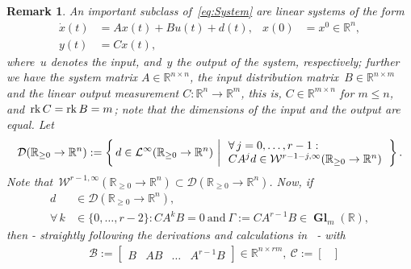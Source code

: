 \documentclass[ envcountsect, envcountsame]{svjour3}
\newtheorem{Remark}[Theorem]{Remark}
\newcommand{\setdef}[2]{\left\{\, #1\, \left|\, \vphantom{#1} #2 \right.\right\}}
\newcommand{\R}{\mathbb{R}}
\newcommand{\cB}{\mathcal{B}}
\newcommand{\cC}{\mathcal{C}}
\newcommand{\cD}{\mathcal{D}}
\newcommand{\cL}{\mathcal{L}}
\newcommand{\cW}{\mathcal{W}}
\newcommand{\rp}{\mathbb{R}_{\geq 0}}
\DeclareMathOperator{\Gl}{\mathbf{Gl}}
\DeclareMathOperator{\rk}{\rm rk}
\begin{document}
%
\begin{Remark} \label{Rem:linear-systems}
An important subclass of~\eqref{eq:System} are linear systems of the form 
\begin{equation} \label{eq:linear-system}
\begin{aligned}
\dot x(t) &=  Ax(t) +   B u(t) + d(t) , & x(0) &= x^0 \in \R^n,\\
y(t) &=  Cx(t),
\end{aligned}
\end{equation}
where~$u$ denotes the input, and~$y$ the output of the system, respectively; further we have the system matrix $ A \in \R^{n \times n}$, 
the input distribution matrix~$ B \in \R^{n \times m}$ and the linear output measurement $ C : \R^{n} \to \R^m$, this is, $ C \in \R^{m \times n}$ for $m \le n$, and~$\rk C = \rk B = m$; note that the dimensions of the input and the output are equal.
%
Let
\begin{equation*}
\begin{aligned}
\cD(\rp \to \R^n) := \setdef{ d \in \cL^\infty(\rp \to \R^n)}{ \begin{array}{l}
\forall \, j=0,\ldots,r-1: \\
CA^{j} d \in \cW^{r-1-j,\infty}(\rp \to \R^n) 
\end{array}  } .
\end{aligned}
\end{equation*}
Note that~$\cW^{r-1,\infty}(\rp \to \R^n) \subset \cD(\rp \to \R^n)$.
%
Now, if
\begin{equation} \label{def:rel-dg-linear-system}
\begin{aligned}
d & \in \cD(\rp \to \R^n), \\
 \forall\, k  &\in \{0,\ldots,r-2\} :  C  A^{k}   B  = 0 \ \text{and} \ \Gamma :=  C  A^{r-1}  B \in \Gl_m(\R),
\end{aligned}
\end{equation}
then - straightly following the derivations and calculations in~\cite[Thm.~3]{IlchWirt13} - with
\begin{equation*}
\begin{aligned}
& \cB := \begin{bmatrix}
B & AB & \ldots & A^{r-1} B
\end{bmatrix} \in \R^{n \times rm} , \
%
 \cC := \begin{bmatrix}

\end{bmatrix}
\end{aligned}
\end{equation*}
\end{Remark}
\end{document}
